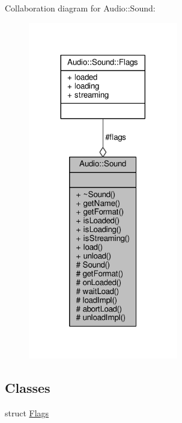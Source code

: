 Collaboration diagram for Audio\+:\+:Sound\+:
\nopagebreak
\begin{figure}[H]
\begin{center}
\leavevmode
\includegraphics[width=185pt]{d5/de8/classAudio_1_1Sound__coll__graph}
\end{center}
\end{figure}
\subsection*{Classes}
\begin{DoxyCompactItemize}
\item 
struct \hyperlink{structAudio_1_1Sound_1_1Flags}{Flags}
\end{DoxyCompactItemize}
